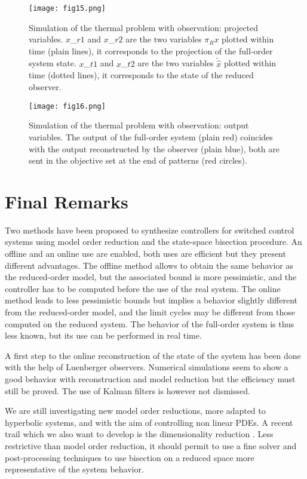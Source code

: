 \begin{figure}
 \centering
 \texttt{[image: fig15.png]}
 \caption{Simulation of the thermal problem with observation: projected variables. $x$\_$r1$ and $x$\_$r2$
  are the two variables $\pi_R x$ plotted within time (plain lines), it corresponds to
 the projection of the full-order system state. $x$\_$t1$ and $x$\_$t2$ are
 the two variables $\tilde{\hat x}$ plotted within time (dotted lines), it corresponds to
 the state of the reduced observer.}
 \label{fig:fig15}
\end{figure}

\begin{figure}
 \centering
 \texttt{[image: fig16.png]}
 \caption{Simulation of the thermal problem with observation: output variables. The output 
 of the full-order system (plain red) coincides with the output reconstructed by the observer (plain blue),
both are sent in the objective set at the end of patterns (red circles).}
 \label{fig:fig16}
\end{figure}


 \section{Final Remarks}
 \label{sec:conclusion}
Two methods have been proposed to synthesize controllers for switched control systems using
model order reduction and the state-space bisection procedure. 
An offline and an online use 
are enabled, both uses are efficient but they present different advantages.
The offline method allows to obtain the same behavior as the reduced-order model, but 
the associated bound is more pessimistic, and the controller has to be computed before the
use of the real system. The online method leads to less pessimistic bounds but implies
a behavior slightly different from the reduced-order model, and the limit cycles may be different
from those computed on the reduced system.
The behavior of the full-order system is thus less known, but its use can be performed 
in real time.

A first step to the online reconstruction of the state of the system has been done
with the help of Luenberger observers. Numerical simulations seem to show a good
behavior with reconstruction and model reduction but the efficiency must still be proved.
The use of Kalman filters is however not dismissed. 

We are still investigating new model order reductions, more adapted to hyperbolic systems,
and with the aim of controlling non linear PDEs.
A recent trail which we also want to develop is the dimensionality reduction \cite{gunawan2001comparison,salah2015synthesis,roweis2000nonlinear}.
Less restrictive than model order reduction, it should permit to use a fine 
solver and post-processing techniques to use bisection on a reduced space 
more representative of the system behavior.


